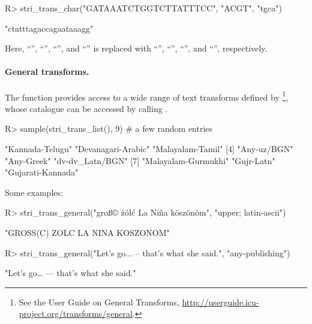 \documentclass[nojss]{jss}
\begin{document}
\begin{Schunk}
\begin{Sinput}
R> stri_trans_char("GATAAATCTGGTCTTATTTCC", "ACGT", "tgca")
\end{Sinput}
\begin{Soutput}
[1] "ctatttagaccagaataaagg"
\end{Soutput}
\end{Schunk}

Here, ``'', ``'', ``'', and ``''
is replaced with
``'', ``'', ``'', and ``'', respectively.



\paragraph{General transforms.}
The  function
provides access to a wide range of text transforms
defined by \footnote{
See the  User Guide on {General Transforms},
\url{http://userguide.icu-project.org/transforms/general}.
}, whose catalogue can be accessed by calling
.

\begin{Schunk}
\begin{Sinput}
R> sample(stri_trans_list(), 9)  # a few random entries
\end{Sinput}
\begin{Soutput}
[1] "Kannada-Telugu"     "Devanagari-Arabic"  "Malayalam-Tamil"
[4] "Any-uz/BGN"         "Any-Greek"          "dv-dv_Latn/BGN"
[7] "Malayalam-Gurmukhi" "Gujr-Latn"          "Gujarati-Kannada"
\end{Soutput}
\end{Schunk}

Some examples:


\begin{Schunk}
\begin{Sinput}
R> stri_trans_general("groß© żółć La Niña köszönöm", "upper; latin-ascii")
\end{Sinput}
\begin{Soutput}
[1] "GROSS(C) ZOLC LA NINA KOSZONOM"
\end{Soutput}
\begin{Sinput}
R> stri_trans_general("Let's go... -- that's what she said.", "any-publishing")
\end{Sinput}
\begin{Soutput}
[1] "Let’s go… — that’s what she said."
\end{Soutput}
\end{Schunk}
\end{document}
